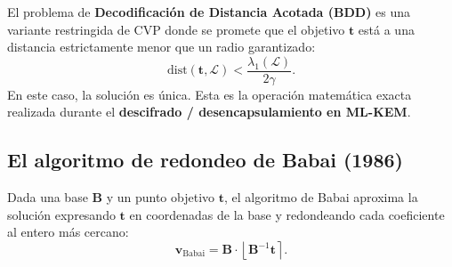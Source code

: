 \documentclass[11pt,a4paper,twoside,openright]{book}
\theoremstyle{plain}
\theoremstyle{definition}
\theoremstyle{remark}
\newcommand{\vv}[1]{\mathbf{#1}}
\newcommand{\mm}[1]{\mathbf{#1}}
\newcommand{\MLKEM}{\textsf{ML-KEM}}
\newcommand{\round}[1]{\left\lfloor #1 \right\rceil}
\begin{document}
El problema de \textbf{Decodificaci\'on de Distancia Acotada (BDD)} es una variante restringida de CVP donde se promete que el objetivo $\vv{t}$ est\'a a una distancia estrictamente menor que un radio garantizado:
\[
  \mathrm{dist}(\vv{t}, \mathcal{L}) < \frac{\lambda_1(\mathcal{L})}{2\gamma}.
\]
En este caso, la soluci\'on es \'unica. Esta es la operaci\'on matem\'atica exacta realizada durante el \textbf{descifrado / desencapsulamiento en \MLKEM{}}.

\subsection{El algoritmo de redondeo de Babai (1986)}

Dada una base $\mm{B}$ y un punto objetivo $\vv{t}$, el algoritmo de Babai aproxima la soluci\'on expresando $\vv{t}$ en coordenadas de la base y redondeando cada coeficiente al entero m\'as cercano:
\[
  \vv{v}_{\text{Babai}} = \mm{B} \cdot \round{\mm{B}^{-1} \vv{t}}.
\]
\end{document}
